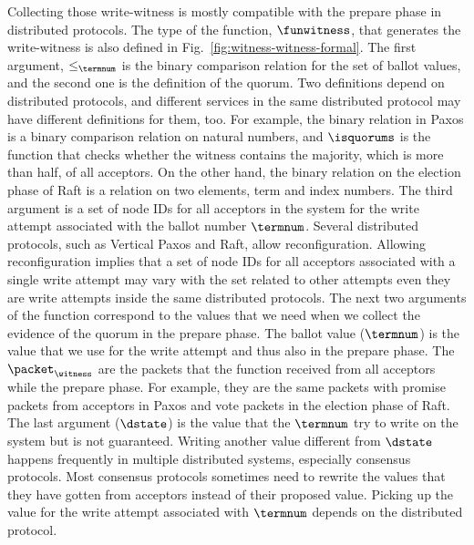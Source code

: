 
Collecting those write-witness is mostly compatible with the prepare phase in distributed protocols. 
The type of the function, $\funwitness$, that generates the write-witness is also defined in Fig.~\ref{fig:witness-witness-formal}.
The first argument, $ \le_{\termnum}$ is the binary comparison relation for the set of ballot values,
and the second one is the definition of the quorum. 
Two definitions depend on distributed protocols, and  different services in the same distributed protocol may have 
different definitions for them, too.
For example, the binary relation in  Paxos is a binary comparison relation on natural numbers, 
and $\isquorums$ is the function that checks whether the witness contains the majority, which is more than half, of all acceptors. 
On the other hand, the binary relation on the election phase of Raft is a relation on two elements, 
term and index numbers. 
The third argument is a set of node IDs for all acceptors in the system for the write attempt associated with the ballot number $\termnum$.
Several distributed protocols, such as Vertical Paxos and Raft, allow reconfiguration. 
Allowing reconfiguration implies that a set of node IDs for all acceptors associated with a single write attempt may vary with the set related to other attempts even they are write attempts inside the same distributed protocols.
The next two arguments of the function correspond to the values that we need when we collect the evidence of the quorum in the prepare phase.
The ballot value ($\termnum$) is the value that we use for the write attempt and thus also in the prepare phase.
The $\packet_\witness$ are the packets that the function received from all acceptors while the prepare phase.
For example, they are the same packets with promise packets from acceptors in Paxos and vote packets in the election phase of Raft. 
The last argument ($\dstate$) is the value that the $\termnum$ try to write on the system but is not guaranteed.
Writing  another value different from $\dstate$  happens frequently in multiple distributed systems, especially consensus protocols.
Most consensus protocols sometimes need to rewrite the values that they have gotten from acceptors instead of 
their proposed value.
Picking up the value for the write attempt associated with $\termnum$ depends on the distributed protocol.


